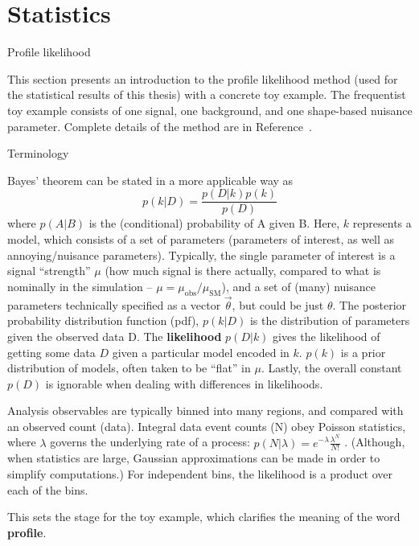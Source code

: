 \chapter{Statistics}
\label{app:statistics}

\begin{section}{Profile likelihood}


This section presents an introduction to the profile likelihood method
(used for the statistical results of this thesis) with a concrete toy example.
The frequentist toy example consists of one signal, one background, and one shape-based
nuisance parameter. Complete details of the method are in Reference~\cite{STAT:Cowan2010js}.


\begin{subsection}{Terminology}

Bayes' theorem can be stated in a more applicable way as
\begin{equation}
p(k|D) = \frac{p(D|k)p(k)}{p(D)}
\end{equation}
where $p(A|B)$ is the (conditional) probability of A given B.
Here, $k$ represents a model, which consists of a set of parameters 
(parameters of interest, as well as annoying/nuisance parameters). 
Typically, the single parameter of interest is a signal ``strength'' $\mu$
    (how much signal is there actually, compared to what is nominally in the simulation -- $\mu = \mu_\mathrm{obs}/\mu_\mathrm{SM}$), 
 and a set of (many) nuisance parameters technically specified
as a vector $\vec{\theta}$, but could be just $\theta$. The posterior probability 
distribution function (pdf), $p(k|D)$ is the distribution of parameters given the observed
data D. The \textbf{likelihood} $p(D|k)$ gives the likelihood of getting some data $D$
given a particular model encoded in $k$. $p(k)$ is a prior distribution of models, often
taken to be ``flat'' in $\mu$. Lastly, the overall constant $p(D)$ is ignorable when dealing
with differences in likelihoods.

Analysis observables are typically binned into many regions, and compared with an observed count (data).
Integral data event counts (N) obey Poisson statistics, where $\lambda$ governs the underlying
rate of a process: $p(N|\lambda) = e^{-\lambda}\frac{\lambda^N}{N!}$ .
(Although, when statistics are large, Gaussian approximations can be made in order to simplify computations.)
For independent bins, the likelihood is a product over each of the bins.

This sets the stage for the toy example, which clarifies the meaning of the word \textbf{profile}.




\end{subsection}
\end{section}

